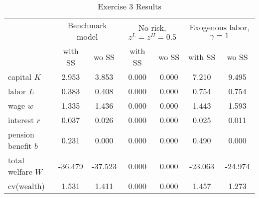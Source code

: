 
    \begin{table}\caption{Exercise 3 Results}
\centering
    \begin{tabular}{lcccccc}
    \toprule
    	& \multicolumn{2}{c}{Benchmark model} & \multicolumn{2}{c}{No risk, $z^L = z^H = 0.5$} & \multicolumn{2}{c}{Exogenous labor, $\gamma = 1$} \\ 
    	\cmidrule(lr){2-3}\cmidrule(lr){4-5}\cmidrule(lr){6-7}
    	& with SS & wo SS & with SS & wo SS & with SS & wo SS\\
    \midrule
	capital $K$ & 2.953 & 3.853 & 0.000 & 0.000 & 7.210 & 9.495\\
	labor $L$ & 0.383 & 0.408 & 0.000 & 0.000 & 0.754 & 0.754\\
	wage $w$ & 1.335 & 1.436 & 0.000 & 0.000 & 1.443 & 1.593\\
	interest $r$ & 0.037 & 0.026 & 0.000 & 0.000 & 0.025 & 0.011\\
	pension benefit $b$ & 0.231 & 0.000 & 0.000 & 0.000 & 0.490 & 0.000\\
	total welfare $W$ & -36.479 & -37.523 & 0.000 & 0.000 & -23.063 & -24.974\\
	cv(wealth) & 1.531 & 1.411 & 0.000 & 0.000 & 1.457 & 1.273\\

    \bottomrule
    \end{tabular}
    \end{table}
